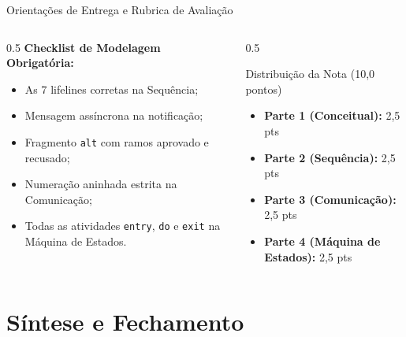 \documentclass[10pt]{beamer}
\begin{document}
\begin{frame}{Orientações de Entrega e Rubrica de Avaliação}
    \begin{columns}
        \begin{column}{0.5\textwidth}
            \textbf{Checklist de Modelagem Obrigatória:}
            \begin{itemize}
                \item As 7 lifelines corretas na Sequência;
                \item Mensagem assíncrona na notificação;
                \item Fragmento \texttt{alt} com ramos aprovado e recusado;
                \item Numeração aninhada estrita na Comunicação;
                \item Todas as atividades \texttt{entry}, \texttt{do} e \texttt{exit} na Máquina de Estados.
            \end{itemize}
        \end{column}
        \begin{column}{0.5\textwidth}
            \begin{block}{Distribuição da Nota (10,0 pontos)}
                \begin{itemize}
                    \item \textbf{Parte 1 (Conceitual):} 2,5 pts
                    \item \textbf{Parte 2 (Sequência):} 2,5 pts
                    \item \textbf{Parte 3 (Comunicação):} 2,5 pts
                    \item \textbf{Parte 4 (Máquina de Estados):} 2,5 pts
                \end{itemize}
            \end{block}
        \end{column}
    \end{columns}
\end{frame}

\section{Síntese e Fechamento}
\end{document}
